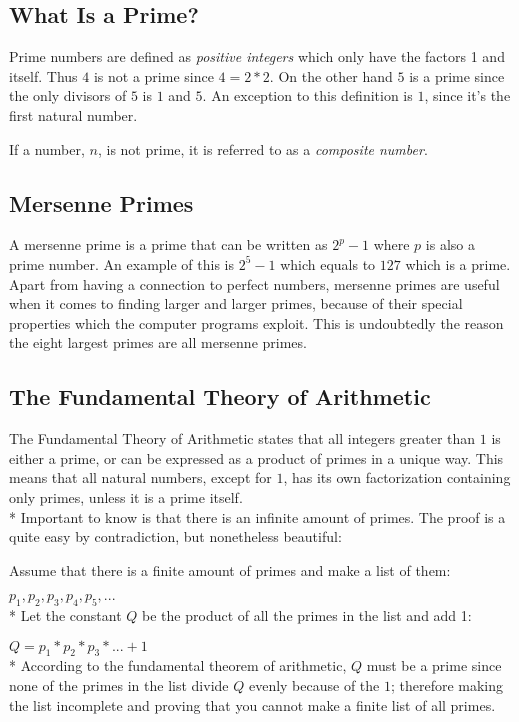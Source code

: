 \documentclass[main.tex]{subfiles}
\begin{document}
\subsection{What Is a Prime?}
Prime numbers are defined as \textit{positive integers} which only have the factors 1 and itself. Thus $4$ is not a prime since $4 = 2 * 2$. On the other hand $5$ is a prime since the only divisors of $5$ is $1$ and $5$. An exception to this definition is $1$, since it's the first natural number.

If a number, $n$, is not prime, it is referred to as a \textit{composite number}.

\subsection{Mersenne Primes}
A mersenne prime is a prime that can be written as $2^{p}-1$ where $p$ is also a prime number. An example of this is $2^5-1$ which equals to $127$ which is a prime. Apart from having a connection to perfect numbers, mersenne primes are useful when it comes to finding larger and larger primes, because of their special properties which the computer programs exploit. This is undoubtedly the reason the eight largest primes are all mersenne primes. 

\subsection{The Fundamental Theory of Arithmetic}
The Fundamental Theory of Arithmetic \cite{theorem:arithmetic} states that all integers greater than $1$ is either a prime, or can be expressed as a product of primes in a unique way. This means that all natural numbers, except for $1$, has its own factorization containing only primes, unless it is a prime itself.
\newline
\\*
Important to know is that there is an infinite amount of primes. The proof is a quite easy by contradiction, but nonetheless beautiful:

\begin{mdframed}
    Assume that there is a finite amount of primes and make a list of them:

    $p_1, p_2, p_3, p_4, p_5, ...$ 
    \newline
    \\*
    Let the constant $Q$ be the product of all the primes in the list and add 1:

    $Q = p_1 * p_2 * p_3 * ... + 1$
    \newline
    \\*
    According to the fundamental theorem of arithmetic, $Q$ must be a prime since none of the primes in the list divide $Q$ evenly because of the $1$; therefore making the list incomplete and proving that you cannot make a finite list of all primes. 
\end{mdframed}
\end{document}
